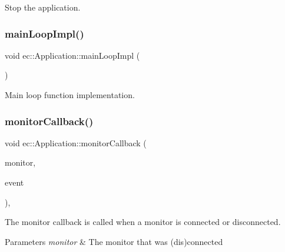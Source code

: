 Stop the application. 

\mbox{\label{classec_1_1_application_ad32692a6e65a00346ab2992eba3a86e7}} 
\subsubsection{\texorpdfstring{main\+Loop\+Impl()}{mainLoopImpl()}}
{\footnotesize\ttfamily void ec\+::\+Application\+::main\+Loop\+Impl (\begin{DoxyParamCaption}{ }\end{DoxyParamCaption})\hspace{0.3cm}{\ttfamily [virtual]}}



Main loop function implementation. 

\mbox{\label{classec_1_1_application_adaeb3f63d8e850d7b83f1c1b61bc73d1}} 
\subsubsection{\texorpdfstring{monitor\+Callback()}{monitorCallback()}}
{\footnotesize\ttfamily void ec\+::\+Application\+::monitor\+Callback (\begin{DoxyParamCaption}\item[{G\+L\+F\+Wmonitor $\ast$}]{monitor,  }\item[{int}]{event }\end{DoxyParamCaption})\hspace{0.3cm}{\ttfamily [static]}, {\ttfamily [protected]}}



The monitor callback is called when a monitor is connected or disconnected. 


\begin{DoxyParams}{Parameters}
{\em monitor} & The monitor that was (dis)connected  \\
\hline
\end{DoxyParams}
\mbox{\label{classec_1_1_application_a329a3b03c23e5aba31bbbb175930dbae}} 
